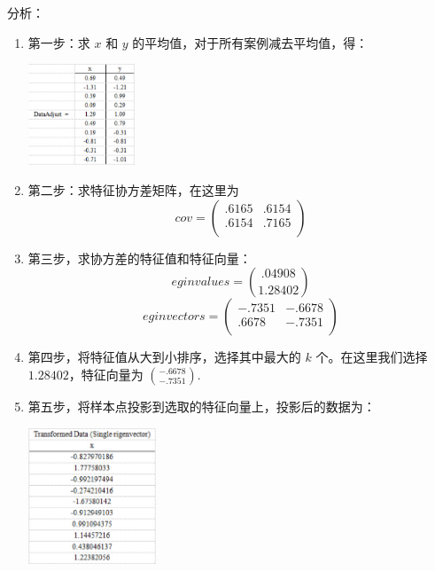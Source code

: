 \documentclass[12pt,a4paper]{article}
\begin{document}
分析：
\begin{enumerate}
  \item 第一步：求 $x$ 和 $y$ 的平均值，对于所有案例减去平均值，得：
  \begin{center}
    \includegraphics[width = 0.25\textwidth]{figures/simple_data_adjust.png}
  \end{center}
  \item 第二步：求特征协方差矩阵，在这里为
  \begin{equation*}
    cov = \left(
    \begin{array}{cc}
      .6165 & .6154 \\
      .6154 & .7165 \\
    \end{array}\right)
  \end{equation*}
  \item 第三步，求协方差的特征值和特征向量：
  $$eginvalues = \binom{.04908}{1.28402}$$
  \begin{equation*}
    eginvectors = \left(
    \begin{array}{cc}
      -.7351 & -.6678\\
      .6678 & -.7351\\
    \end{array}\right)
  \end{equation*}
  \item 第四步，将特征值从大到小排序，选择其中最大的 $k$ 个。在这里我们选择 $1.28402$，特征向量为 $\binom{-.6678}{-.7351}$.
  \item 第五步，将样本点投影到选取的特征向量上，投影后的数据为：
  \begin{center}
    \includegraphics[width = 0.3\textwidth]{figures/simple_transdata.png}
  \end{center}
\end{enumerate}
\end{document}
